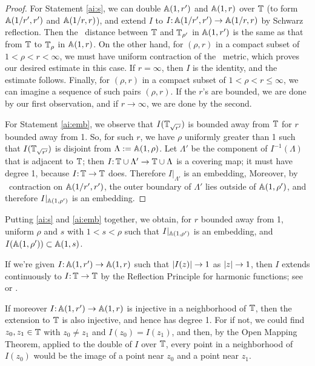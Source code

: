 \begin{proof}
For Statement \ref{ai:s},
we can double $\aa {r'}$ and $\aa r$ over $\T$
(to form $\aaa {r'}$ and $\aaa{r}$), and extend $I$ to $I\from \aaa{r'}\to \aaa r$ by Schwarz reflection. 
Then the \poincare\ distance between $\T$ and $\T_{\rho'}$ in $\aa{r'}$
 is the same as that from $\T$ to $\T_\rho$ in $\aa r$. 
On the other hand, 
for $(\rho, r)$ in a compact subset of $1 < \rho < r < \infty$,
we must have uniform contraction of the \poincare\ metric, 
which proves our desired estimate in this case.
If $r = \infty$, 
then $I$ is the identity, and the estimate follows.
Finally, 
for $(\rho, r)$ in a compact subset of $1 < \rho < r \le \infty$,
we can imagine a sequence of such pairs $(\rho, r)$.
If the $r$'s are bounded, we are done by our first observation,
and if $r \to \infty$, we are done by the second.

For Statement \ref{ai:emb},
we observe that $I(\T_{\sqrt{r'}})$ is bounded away from $\T$ for $r$ bounded away from 1.
So,
for such $r$,
we have $\rho$ uniformly greater than 1 such that $I(\T_{\sqrt{r'}})$ is disjoint from $\Lambda := \aa \rho$.
Let $\Lambda'$ be the component of $I^{-1}(\Lambda)$ that is adjacent to $\T$;
then $I\from \T \cup \Lambda' \to \T \cup \Lambda$ is a covering map;
it must have degree 1, because $I\from \T \to \T$ does.
Therefore $I|_{\Lambda'}$ is an embedding,
Moreover,
by \poincare\ contraction on $\aaa {r'}$,
the outer boundary of $\Lambda'$ lies outside of $\aa{\rho'}$,
and therefore $I|_{\aa{\rho'}}$ is an embedding.
\end{proof}

\begin{rem} \label{ai:both}
Putting \eqref{ai:s} and \eqref{ai:emb} together,
we obtain, for $r$ bounded away from 1,
uniform $\rho$ and $s$ with $1 < s < \rho$ such that $I|_{\aa {\rho'}}$ is an embedding, 
and $I(\aa {\rho'}) \subset \aa s$. 
\end{rem}

\begin{rem} \label{ai:extends}
If we're given $I\from \aa{r'}\to \aa{r}$ such that $\abs{I(z)} \to 1$ as $\abs z \to 1$,
then $I$ extends continuously to $I\from \T \to \T$ by the Reflection Principle for harmonic functions;
see \cite{Ahlfors:complex} or \cite{Gamelin}.

If moreover $I\from \aa{r'} \to \aa{r}$ is injective in a neighborhood of $\T$,
then the extension to $\T$ is also injective, and hence has degree 1.
For if not,
we could find $z_0, z_1 \in \T$ with $z_0 \neq z_1$ and $I(z_0) = I(z_1)$,
and then,
by the Open Mapping Theorem, 
applied to the double of $I$ over $\T$,
every point in a neighborhood of $I(z_0)$ would be the image of a point near $z_0$ and a point near $z_1$. 
\end{rem}

